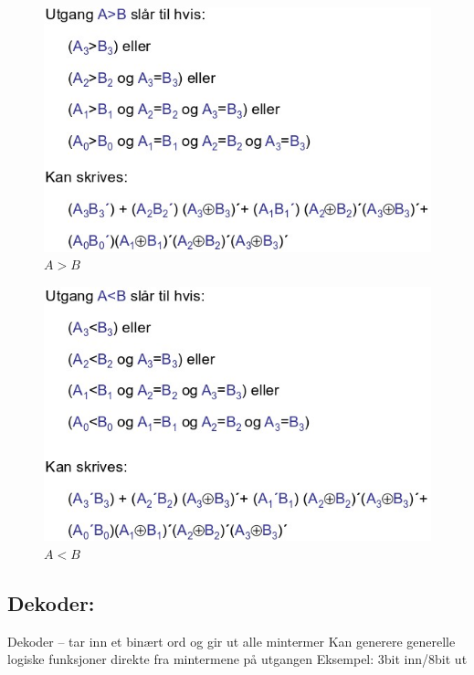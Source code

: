 \documentclass{article}
\begin{document}
	
	\begin{figure}[H]
		\includegraphics[scale = 0.6]{komp2.jpg}
		\caption{$A>B$}
	\end{figure}
	
	\begin{figure}[H]
		\includegraphics[scale = 0.6]{komp3.jpg}
		\caption{$A<B$}
	\end{figure}
	
	\subsection{Dekoder:}
	 Dekoder – tar inn et binært ord og gir ut alle mintermer 
	 Kan generere generelle logiske funksjoner direkte fra mintermene på utgangen 
	 Eksempel: 3bit inn/8bit ut 
	 
\end{document}
